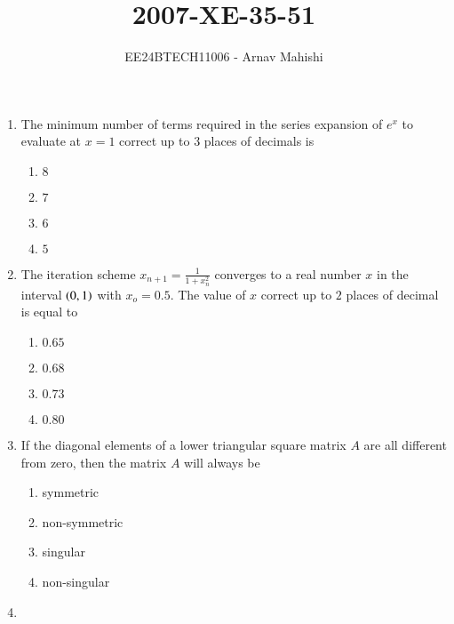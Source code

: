 \documentclass[journal]{IEEEtran}
\begin{document}

\vspace{3cm}

\title{2007-XE-35-51}
\author{EE24BTECH11006 - Arnav Mahishi}
{\let\newpage\relax\maketitle}
\begin{enumerate}
\item{
The minimum number of terms required in the series expansion of $e^x$ to evaluate at $x=1$ correct up to $3$ places of decimals is
\begin{multicols}{4}
\begin{enumerate}
\item$8$
\item$7$
\item$6$
\item$5$
\end{enumerate}
\end{multicols}
}
\item{
The iteration scheme $x_{n+1}=\frac{1}{1+x_n^2}$ converges to a real number $x$ in the interval $\left(0,1\right)$ with $x_o=0.5$. The value of $x$ correct up to $2$ places of decimal is equal to
\begin{multicols}{4}
\begin{enumerate}
\item $0.65$
\item $0.68$
\item $0.73$
\item $0.80$
\end{enumerate}
\end{multicols}}
\item{
If the diagonal elements of a lower triangular square matrix $A$ are all different from zero, then the matrix $A$  will always be 
\begin{multicols}{4}
\begin{enumerate}
\item symmetric
\item non-symmetric
\item singular
\item non-singular
\end{enumerate}
\end{multicols}
}
\item{
}
\end{enumerate}
\end{document}
